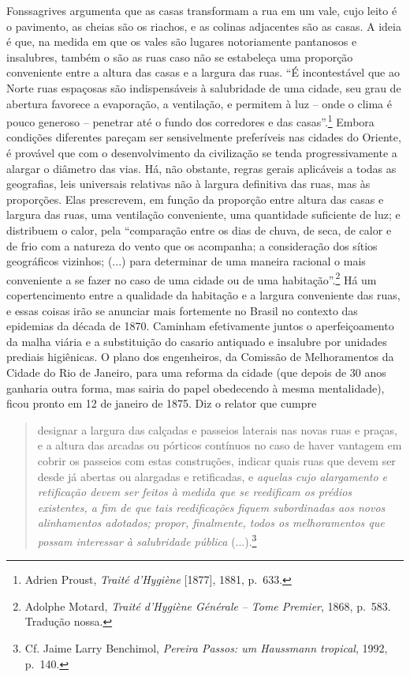 Fonssagrives argumenta que as casas transformam a rua em um vale, cujo
leito é o pavimento, as cheias são os riachos, e as colinas adjacentes
são as casas. A ideia é que, na medida em que os vales são lugares
notoriamente pantanosos e insalubres, também o são as ruas caso não se
estabeleça uma proporção conveniente entre a altura das casas e a
largura das ruas. ``É incontestável que ao Norte ruas espaçosas são
indispensáveis à salubridade de uma cidade, seu grau de abertura
favorece a evaporação, a ventilação, e permitem à luz -- onde o clima é
pouco generoso -- penetrar até o fundo dos corredores e das
casas''.\footnote{Adrien Proust, \emph{Traité d'Hygiène} {[}1877{]},
  1881, p.~633.} Embora condições diferentes pareçam ser sensivelmente
preferíveis nas cidades do Oriente, é provável que com o desenvolvimento
da civilização se tenda progressivamente a alargar o diâmetro das vias.
Há, não obstante, regras gerais aplicáveis a todas as geografias, leis
universais relativas não à largura definitiva das ruas, mas às
proporções. Elas prescrevem, em função da proporção entre altura das
casas e largura das ruas, uma ventilação conveniente, uma quantidade
suficiente de luz; e distribuem o calor, pela ``comparação entre os dias
de chuva, de seca, de calor e de frio com a natureza do vento que os
acompanha; a consideração dos sítios geográficos vizinhos; (...) para
determinar de uma maneira racional o mais conveniente a se fazer no caso
de uma cidade ou de uma habitação''.\footnote{Adolphe Motard,
  \emph{Traité d'Hygiène Générale} \emph{-- Tome Premier}, 1868, p.~583.
  Tradução nossa.} Há um copertencimento entre a qualidade da habitação
e a largura conveniente das ruas, e essas coisas irão se anunciar mais
fortemente no Brasil no contexto das epidemias da década de 1870.
Caminham efetivamente juntos o aperfeiçoamento da malha viária e a
substituição do casario antiquado e insalubre por unidades prediais
higiênicas. O plano dos engenheiros, da Comissão de Melhoramentos da
Cidade do Rio de Janeiro, para uma reforma da cidade (que depois de 30
anos ganharia outra forma, mas sairia do papel obedecendo à mesma
mentalidade), ficou pronto em 12 de janeiro de 1875. Diz o relator que
cumpre

\begin{quote}
designar a largura das calçadas e passeios laterais nas novas ruas e
praças, e a altura das arcadas ou pórticos contínuos no caso de haver
vantagem em cobrir os passeios com estas construções, indicar quais ruas
que devem ser desde já abertas ou alargadas e retificadas, e
\emph{aquelas cujo alargamento e retificação devem ser feitos à medida
que se reedificam os prédios existentes, a fim de que tais reedificações
fiquem subordinadas aos novos alinhamentos adotados; propor, finalmente,
todos os melhoramentos que possam interessar à salubridade pública}
(...).\footnote{Cf. Jaime Larry Benchimol, \emph{Pereira Passos: um
  Haussmann tropical}, 1992, p.~140.}
\end{quote}

